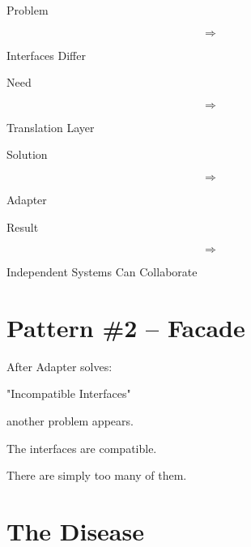 \documentclass[11pt,a4paper]{book}
\begin{document}
\begin{compressionbox}

Problem

\[
\Rightarrow
\]

Interfaces Differ

\vspace{0.5em}

Need

\[
\Rightarrow
\]

Translation Layer

\vspace{0.5em}

Solution

\[
\Rightarrow
\]

Adapter

\vspace{0.5em}

Result

\[
\Rightarrow
\]

Independent Systems
Can Collaborate

\end{compressionbox}
\section{Pattern \#2 -- Facade}

After Adapter solves:


"Incompatible Interfaces"


another problem appears.


The interfaces are compatible.


There are simply too many of them.


\section{The Disease}
\end{document}
